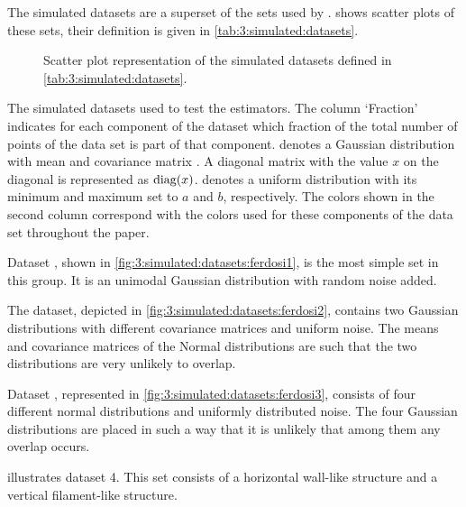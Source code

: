 
The simulated datasets are a superset of the sets used by \textcite{ferdosi2011comparison}.  shows scatter plots of these sets, their definition is given in \cref{tab:3:simulated:datasets}.

\begin{figure*}
	\centering
				
	\caption{Scatter plot representation of the simulated datasets defined in \cref{tab:3:simulated:datasets}. }
	\label{fig:3:simulated:datasets}
\end{figure*}

\begin{table*}
	\centering
	
	\caption{The simulated datasets used to test the estimators. The column `Fraction' indicates for each component of the dataset which fraction of the total number of points of the data set is part of that component. \gaussDist{\varMean}{\varCovarianceMatrix} denotes a Gaussian distribution with mean \varMean and covariance matrix \varCovarianceMatrix. A diagonal matrix with the value $x$ on the diagonal is represented as $\operatorname{diag}(x)$.  denotes a uniform distribution with its minimum and maximum set to $a$ and $b$, respectively. The colors shown in the second column correspond with the colors used for these components of the data set throughout the paper.} 	
	\label{tab:3:simulated:datasets}
\end{table*}

	Dataset \ferdosiOne, shown in \cref{fig:3:simulated:datasets:ferdosi1}, is the most simple set in this group. It is an unimodal Gaussian distribution with random noise added. 

	The \ordinalstringnum{\ferdosiTwoNum} dataset, depicted in \cref{fig:3:simulated:datasets:ferdosi2}, contains two Gaussian distributions with different covariance matrices and uniform noise. The means and covariance matrices of the Normal distributions are such that the two distributions are very unlikely to overlap. 

	Dataset \ferdosiThree, represented in \cref{fig:3:simulated:datasets:ferdosi3}, consists of four different normal distributions and uniformly distributed noise. The four Gaussian distributions are placed in such a way that it is unlikely that among them any overlap occurs.

	 illustrates dataset 4. This set consists of a horizontal wall-like structure and a vertical filament-like structure. 

